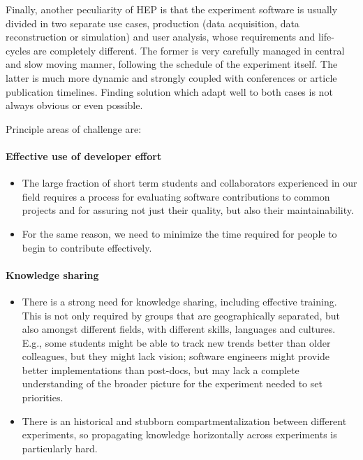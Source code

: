 \documentclass[12pt,a4paper]{article}
\begin{document}
Finally, another peculiarity of HEP is that the experiment software is
usually divided in two separate use cases, production (data acquisition,
data reconstruction or simulation) and user analysis, whose requirements
and life-cycles are completely different. The former is very carefully
managed in central and slow moving manner, following the schedule of the
experiment itself. The latter is much more dynamic and strongly coupled
with conferences or article publication timelines. Finding solution
which adapt well to both cases is not always obvious or even possible.

Principle areas of challenge are:

\paragraph{Effective use of developer effort}

\begin{itemize}
\item
    The large fraction of short term students and collaborators
  experienced in our field requires a process for evaluating software
  contributions to common projects and for assuring not just their
  quality, but also their maintainability.
  \item
    For the same reason, we need to minimize the time required for people
  to begin to contribute effectively.
  \end{itemize}

\paragraph{Knowledge sharing}

\begin{itemize}
\item
    There is a strong need for knowledge sharing, including effective
  training. This is not only required by groups that are geographically
  separated, but also amongst different fields, with different skills,
  languages and cultures. E.g., some students might be able to track new
  trends better than older colleagues, but they might lack vision;
  software engineers might provide better implementations than
  post-docs, but may lack a complete understanding of the broader
  picture for the experiment needed to set priorities.
  \item
    There is an historical and stubborn compartmentalization between
  different experiments, so propagating knowledge horizontally across
  experiments is particularly hard.
  \end{itemize}
\end{document}
